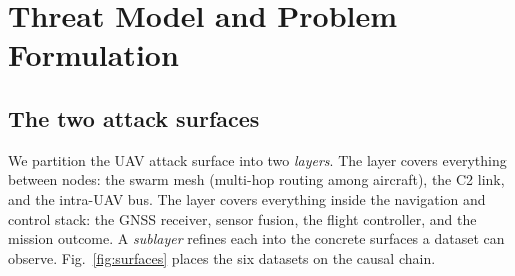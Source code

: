 \section{Threat Model and Problem Formulation}
\label{sec:problem}
\subsection{The two attack surfaces}
We partition the UAV attack surface into two \emph{layers}. The \layernet{}
layer covers everything between nodes: the swarm mesh (multi-hop routing among
aircraft), the C2 link, and the intra-UAV bus. The \layerauto{} layer covers
everything inside the navigation and control stack: the GNSS receiver, sensor
fusion, the flight controller, and the mission outcome. A \emph{sublayer}
refines each into the concrete surfaces a dataset can observe.
Fig.~\ref{fig:surfaces} places the six datasets on the causal chain.


